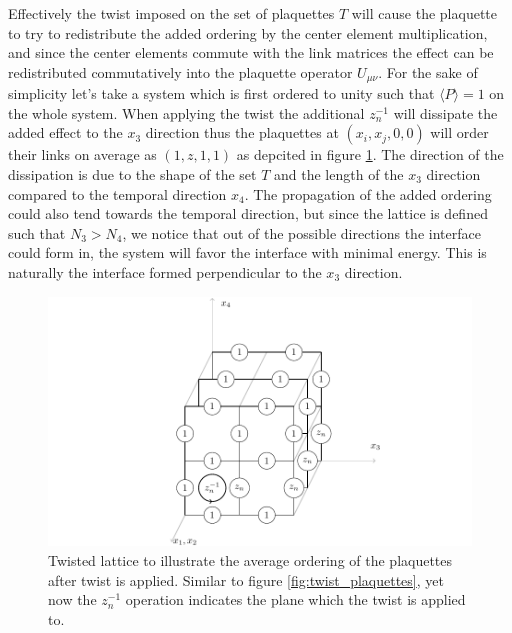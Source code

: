 \documentclass[english,twoside,openright]{UH_TCM_MSc}
\begin{document}
Effectively the twist imposed on the set of plaquettes $T$ will cause the plaquette to try to redistribute the added ordering by the center element multiplication, and since the center elements commute with the link matrices the effect can be redistributed commutatively into the plaquette operator $U_{\mu\nu}$. For the sake of simplicity let's take a system which is first ordered to unity such that $\langle P \rangle = 1$ on the whole system. When applying the twist the additional $z^{-1}_n$ will dissipate the added effect to the $x_3$ direction thus the plaquettes at $(x_i,x_j,0,0)$ will order their links on average as $(1,z,1,1)$ as depcited in figure \ref{fig:twist_surface}. The direction of the dissipation is due to the shape of the set $T$ and the length of the $x_3$ direction compared to the temporal direction $x_4$.  The propagation of the added ordering could also tend towards the temporal direction, but since the lattice is defined such that $N_3 > N_4$, we notice that out of the possible directions the interface could form in, the system will favor the interface with minimal energy. This is naturally the interface formed perpendicular to the $x_3$ direction.
\begin{figure}[htpb]
    \centering
    \includegraphics[width=1\textwidth]{final_plots/misc/surface_twist.pdf}
    \caption{Twisted lattice to illustrate the average ordering of the plaquettes after twist is applied. Similar to figure \ref{fig:twist_plaquettes}, yet now the $z^{-1}_n$ operation indicates the plane which the twist is applied to.}
    \label{fig:twist_surface}
\end{figure}
\end{document}
